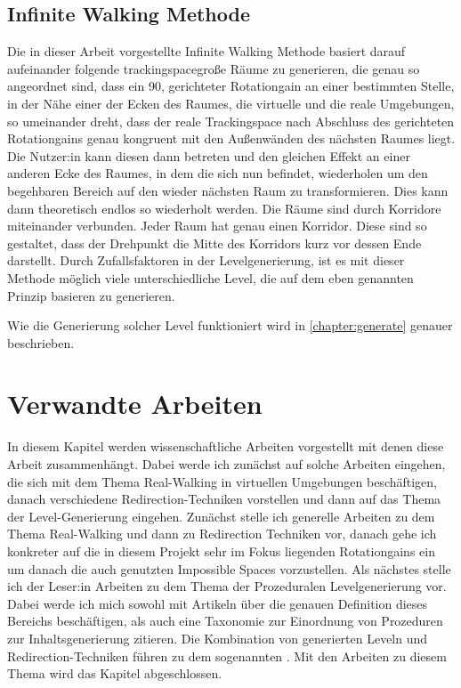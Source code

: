 \section{Infinite Walking Methode}
Die in dieser Arbeit vorgestellte Infinite Walking Methode basiert darauf aufeinander folgende trackingspacegroße Räume zu generieren, die genau so angeordnet sind, dass ein
90\textdegree, gerichteter
Rotationgain an einer bestimmten Stelle, in der Nähe einer der Ecken des Raumes, die virtuelle und die reale Umgebungen, so umeinander dreht, dass der reale Trackingspace nach Abschluss des gerichteten Rotationgains genau kongruent mit den Außenwänden des nächsten Raumes liegt. Die Nutzer:in kann diesen dann betreten und den gleichen Effekt an einer anderen Ecke des Raumes, in dem die sich nun befindet, wiederholen um den begehbaren Bereich auf den wieder nächsten Raum zu transformieren. Dies kann dann theoretisch endlos so wiederholt werden. Die Räume sind durch Korridore miteinander verbunden. Jeder Raum hat genau einen Korridor. Diese sind so gestaltet, dass der Drehpunkt die Mitte des Korridors kurz vor dessen Ende darstellt. Durch Zufallsfaktoren in der Levelgenerierung, ist es mit dieser Methode möglich viele unterschiedliche Level, die auf dem eben genannten Prinzip basieren zu generieren. %

Wie die Generierung solcher Level funktioniert wird in \autoref{chapter:generate} genauer beschrieben.

\chapter{Verwandte Arbeiten}\label{chapter:relatedwork}


In diesem Kapitel werden wissenschaftliche Arbeiten vorgestellt mit denen diese Arbeit zusammenhängt. Dabei werde ich zunächst auf solche Arbeiten eingehen, die sich mit dem Thema Real-Walking in virtuellen Umgebungen beschäftigen, danach verschiedene Redirection-Techniken vorstellen und dann auf das Thema der Level-Generierung eingehen. Zunächst stelle ich generelle Arbeiten zu dem Thema Real-Walking und dann zu Redirection Techniken vor, danach gehe ich konkreter auf die in diesem Projekt sehr im Fokus liegenden Rotationgains ein um danach die auch genutzten Impossible Spaces vorzustellen. Als nächstes stelle ich der Leser:in Arbeiten zu dem Thema der Prozeduralen Levelgenerierung vor. Dabei werde ich mich sowohl mit Artikeln über die genauen Definition dieses Bereichs beschäftigen, als auch eine Taxonomie zur Einordnung von Prozeduren zur Inhaltsgenerierung zitieren. Die Kombination von generierten Leveln und Redirection-Techniken führen zu dem sogenannten . Mit den Arbeiten zu diesem Thema wird das Kapitel abgeschlossen.

